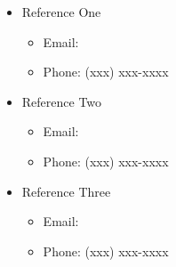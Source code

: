\documentclass[12pt]{article}
\begin{document}
 \pagestyle{plain}

\begin{itemize}
	\item Reference One
	\begin{itemize}
		\item Email: 
		\item Phone: (xxx) xxx-xxxx
	\end{itemize}
	\item Reference Two
	\begin{itemize}
		\item Email: 
		\item Phone: (xxx) xxx-xxxx
	\end{itemize}
	\item Reference Three
	\begin{itemize}
		\item Email: 
		\item Phone: (xxx) xxx-xxxx
	\end{itemize}
\end{itemize}

\end{document}

